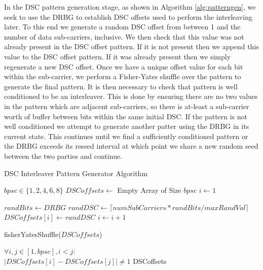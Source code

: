 \documentclass[sigconf, anonymous]{acmart}
\begin{document}
In the DSC pattern generation stage, as shown in Algorithm \ref{alg:patterngen}, we seek to use the DRBG to establish DSC offsets used to perform the interleaving later. To this end we generate a random DSC offset from between 1 and the number of data sub-carriers, inclusive. We then check that this value was not already present in the DSC offset pattern. If it is not present then we append this value to the DSC offset pattern. If it was already present then we simply regenerate a new DSC offset. Once we have a unique offset value for each bit within the sub-carrier, we perform a Fisher-Yates shuffle over the pattern to generate the final pattern\cite{fisher1943statistical}. It is then necessary to check that pattern is well conditioned to be an interleaver. This is done by ensuring there are no two values in the pattern which are adjacent sub-carriers, so there is at-least a sub-carrier worth of buffer between bits within the same initial DSC. If the pattern is not well conditioned we attempt to generate another patter using the DRBG in its current state. This continues until we find a sufficiently conditioned pattern or the DRBG exceeds its reseed interval at which point we share a new random seed between the two parties and continue.

\begin{algorithm}[ht]
\caption{DSC Interleaver Pattern Generator Algorithm}
\label{alg:patterngen}
\begin{algorithmic}

\REQUIRE $bpsc \in \{1,2,4,6,8\}$
\STATE $DSCoffsets \leftarrow $ Empty Array of Size $bpsc$
\STATE $i \leftarrow 1$
\STATE

    \STATE $randBits \leftarrow DRBG$
    \STATE $randDSC \leftarrow \lceil numSubCarriers * randBits / maxRandVal \rceil$
        \STATE $DSCoffsets[i] \leftarrow randDSC$
        \STATE $i \leftarrow i + 1$
    \ENDIF
\ENDWHILE
\STATE

\STATE fisherYatesShuffle($DSCoffsets$)
\STATE 

\ENSURE $\forall i,j \in [1, bpsc], i < j:$ \\ $|DSCoffsets[i]-DSCoffsets[j]| \neq 1$
\RETURN DSCoffsets
\end{algorithmic}
\end{algorithm}
\end{document}
